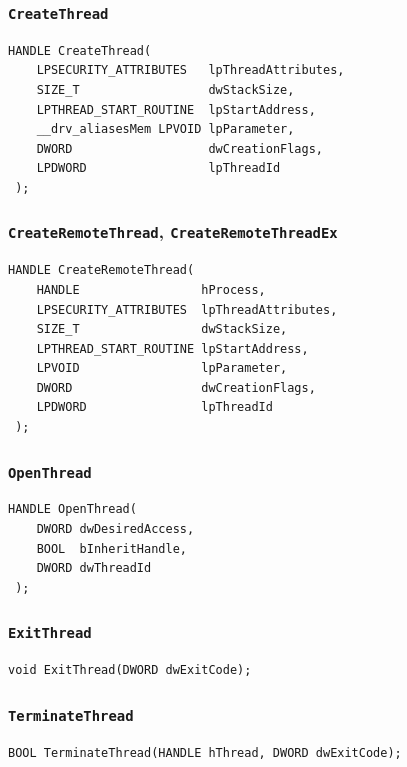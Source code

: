 \documentclass[a4paper,12pt,openright]{book}
\begin{document}
\subsubsection{\texttt{CreateThread}}

\begin{lstlisting}[style=func]
 HANDLE CreateThread(
	LPSECURITY_ATTRIBUTES   lpThreadAttributes,
	SIZE_T                  dwStackSize,
	LPTHREAD_START_ROUTINE  lpStartAddress,
	__drv_aliasesMem LPVOID lpParameter,
	DWORD                   dwCreationFlags,
	LPDWORD                 lpThreadId
 );
\end{lstlisting}

\subsubsection{\texttt{CreateRemoteThread}, \texttt{CreateRemoteThreadEx}}

\begin{lstlisting}[style=func]
 HANDLE CreateRemoteThread(
	HANDLE                 hProcess,
	LPSECURITY_ATTRIBUTES  lpThreadAttributes,
	SIZE_T                 dwStackSize,
	LPTHREAD_START_ROUTINE lpStartAddress,
	LPVOID                 lpParameter,
	DWORD                  dwCreationFlags,
	LPDWORD                lpThreadId
 );
\end{lstlisting}

\subsubsection{\texttt{OpenThread}}

\begin{lstlisting}[style=func]
 HANDLE OpenThread(
	DWORD dwDesiredAccess,
	BOOL  bInheritHandle,
	DWORD dwThreadId
 );
\end{lstlisting}

\subsubsection{\texttt{ExitThread}}

\begin{lstlisting}[style=func]
 void ExitThread(DWORD dwExitCode);
\end{lstlisting}

\subsubsection{\texttt{TerminateThread}}

\begin{lstlisting}[style=func]
 BOOL TerminateThread(HANDLE hThread, DWORD dwExitCode);
\end{lstlisting}
\end{document}

